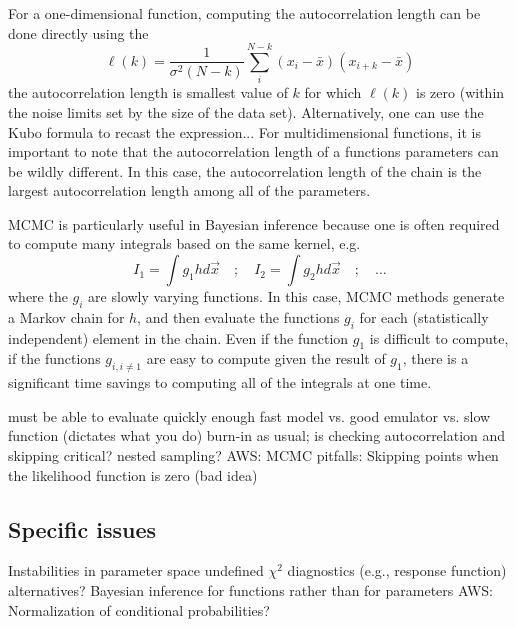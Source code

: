 For a one-dimensional function, computing the autocorrelation length
can be done directly using the 
\begin{equation}
  \ell(k) = \frac{1}{\sigma^2(N-k)}
  \sum_i^{N-k} (x_i- \bar{x})(x_{i+k}- \bar{x})
\end{equation}
the autocorrelation length is smallest value of $k$ for which
$\ell(k)$ is zero (within the noise limits set by the size of the data
set). Alternatively, one can use the Kubo formula to
recast the expression...  For multidimensional functions, it is important to note that
the autocorrelation length of a functions parameters can be wildly
different. In this case, the autocorrelation length of the chain is
the largest autocorrelation length among all of the parameters.

MCMC is particularly useful in Bayesian inference because one is
often required to compute many integrals based on the same kernel,
e.g.
\begin{equation}
  I_1 = \int g_1 h d \vec{x} \quad ; \quad
  I_2 = \int g_2 h d \vec{x} \quad ; \quad \ldots
\end{equation}
where the $g_i$ are slowly varying functions. In this case, MCMC
methods generate a Markov chain for $h$, and then evaluate the
functions $g_i$ for each (statistically independent) element in the
chain. Even if the function $g_1$ is difficult to compute, 
if the functions $g_{i,i\neq 1}$ are easy to compute given the
result of $g_1$, there is a significant time savings to computing
all of the integrals at one time.


  \bi
    \I must be able to evaluate quickly enough
    \I fast model vs. good emulator vs. slow function (dictates what you do)
    \I burn-in as usual; is checking autocorrelation and skipping critical?
    \I nested sampling?
    \I AWS: MCMC pitfalls: Skipping points when the likelihood
    function is zero (bad idea)
  \ei


\subsection{Specific issues}  \label{subsec:issues}

  \bi
    \I Instabilities in parameter space
      \bi
        \I undefined $\chi^2$
        \I diagnostics (e.g., response function) 
        \I alternatives?
      \ei     
      \I Bayesian inference for functions rather than for parameters
      \I AWS: Normalization of conditional probabilities?
  \ei

